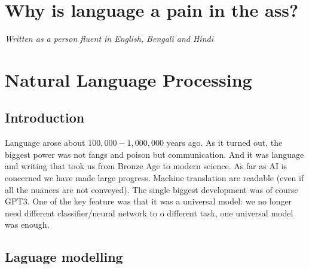 
\chapter{Why is language a pain in the ass?}
\textit{Written as a person fluent in English, Bengali and Hindi}




\chapter{Natural Language Processing}

\section{Introduction}

    Language arose about $100,000-1,000,000$ years ago. As it turned out, the biggest power was not fangs and poison but communication. And it was language and writing that took us from Bronze Age to modern science. As far as AI is concerned we have made large progress. Machine translation are readable (even if all the nuances are not conveyed). The single biggest development was of course GPT3. One of the key feature was that it was a universal model: we no longer need different classifier/neural network to o different task, one universal model was enough.

\section{Laguage modelling}

